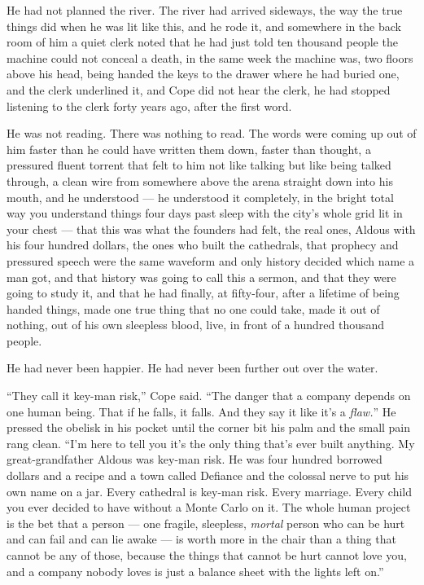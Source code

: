 \documentclass[11pt,openany]{book}
\begin{document}
He had not planned the river. The river had arrived sideways, the way the true things did when he was lit like this, and he rode it, and somewhere in the back room of him a quiet clerk noted that he had just told ten thousand people the machine could not conceal a death, in the same week the machine was, two floors above his head, being handed the keys to the drawer where he had buried one, and the clerk underlined it, and Cope did not hear the clerk, he had stopped listening to the clerk forty years ago, after the first word.

He was not reading. There was nothing to read. The words were coming up out of him faster than he could have written them down, faster than thought, a pressured fluent torrent that felt to him not like talking but like being talked through, a clean wire from somewhere above the arena straight down into his mouth, and he understood --- he understood it completely, in the bright total way you understand things four days past sleep with the city's whole grid lit in your chest --- that this was what the founders had felt, the real ones, Aldous with his four hundred dollars, the ones who built the cathedrals, that prophecy and pressured speech were the same waveform and only history decided which name a man got, and that history was going to call this a sermon, and that they were going to study it, and that he had finally, at fifty-four, after a lifetime of being handed things, made one true thing that no one could take, made it out of nothing, out of his own sleepless blood, live, in front of a hundred thousand people.

He had never been happier. He had never been further out over the water.

``They call it key-man risk,'' Cope said. ``The danger that a company depends on one human being. That if he falls, it falls. And they say it like it's a \textit{flaw.}'' He pressed the obelisk in his pocket until the corner bit his palm and the small pain rang clean. ``I'm here to tell you it's the only thing that's ever built anything. My great-grandfather Aldous was key-man risk. He was four hundred borrowed dollars and a recipe and a town called Defiance and the colossal nerve to put his own name on a jar. Every cathedral is key-man risk. Every marriage. Every child you ever decided to have without a Monte Carlo on it. The whole human project is the bet that a person --- one fragile, sleepless, \textit{mortal} person who can be hurt and can fail and can lie awake --- is worth more in the chair than a thing that cannot be any of those, because the things that cannot be hurt cannot love you, and a company nobody loves is just a balance sheet with the lights left on.''
\end{document}
